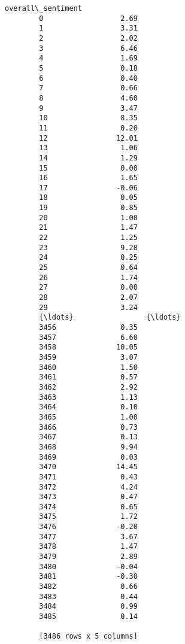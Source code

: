 \documentclass[11pt]{article}
\begin{document}
\begin{Verbatim}[commandchars=\\\{\}]
              overall\_sentiment  
        0                  2.69  
        1                  3.31  
        2                  2.02  
        3                  6.46  
        4                  1.69  
        5                  0.18  
        6                  0.40  
        7                  0.66  
        8                  4.60  
        9                  3.47  
        10                 8.35  
        11                 0.20  
        12                12.01  
        13                 1.06  
        14                 1.29  
        15                 0.00  
        16                 1.65  
        17                -0.06  
        18                 0.05  
        19                 0.85  
        20                 1.00  
        21                 1.47  
        22                 1.25  
        23                 9.28  
        24                 0.25  
        25                 0.64  
        26                 1.74  
        27                 0.00  
        28                 2.07  
        29                 3.24  
        {\ldots}                 {\ldots}  
        3456               0.35  
        3457               6.60  
        3458              10.05  
        3459               3.07  
        3460               1.50  
        3461               0.57  
        3462               2.92  
        3463               1.13  
        3464               0.10  
        3465               1.00  
        3466               0.73  
        3467               0.13  
        3468               9.94  
        3469               0.03  
        3470              14.45  
        3471               0.43  
        3472               4.24  
        3473               0.47  
        3474               0.65  
        3475               1.72  
        3476              -0.20  
        3477               3.67  
        3478               1.47  
        3479               2.89  
        3480              -0.04  
        3481              -0.30  
        3482               0.66  
        3483               0.44  
        3484               0.99  
        3485               0.14  
        
        [3486 rows x 5 columns]
\end{Verbatim}
            
\end{document}
